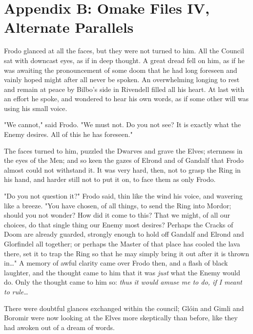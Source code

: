 \chapter{Appendix B: Omake Files IV, Alternate Parallels}


\noindent{}Frodo glanced at all the faces, but they were not turned to him. All the 
Council sat with downcast eyes, as if in deep thought. A great dread fell on 
him, as if he was awaiting the pronouncement of some doom that he had long 
foreseen and vainly hoped might after all never be spoken. An overwhelming 
longing to rest and remain at peace by Bilbo's side in Rivendell filled all his 
heart. At last with an effort he spoke, and wondered to hear his own words, as 
if some other will was using his small voice.

"We cannot," said Frodo. "We must not. Do you not see? It is exactly what the 
Enemy desires. All of this he has foreseen."

The faces turned to him, puzzled the Dwarves and grave the Elves; sternness in 
the eyes of the Men; and so keen the gazes of Elrond and of Gandalf that Frodo 
almost could not withstand it. It was very hard, then, not to grasp the Ring in 
his hand, and harder still not to put it on, to face them as only Frodo.

"Do you not question it?" Frodo said, thin like the wind his voice, and 
wavering like a breeze. "You have chosen, of all things, to send the Ring into 
Mordor; should you not wonder? How did it come to this? That we might, of all 
our choices, do that single thing our Enemy most desires? Perhaps the Cracks of 
Doom are already guarded, strongly enough to hold off Gandalf and Elrond and 
Glorfindel all together; or perhaps the Master of that place has cooled the 
lava there, set it to trap the Ring so that he may simply bring it out after it 
is thrown in{\ldots}" A memory of awful clarity came over Frodo then, and a 
flash of black laughter, and the thought came to him that it was \emph{just} 
what the Enemy would do. Only the thought came to him so: \emph{thus it would 
amuse me to do, if I meant to rule{\ldots}}

There were doubtful glances exchanged within the council; Glóin and Gimli and 
Boromir were now looking at the Elves more skeptically than before, like they 
had awoken out of a dream of words.

